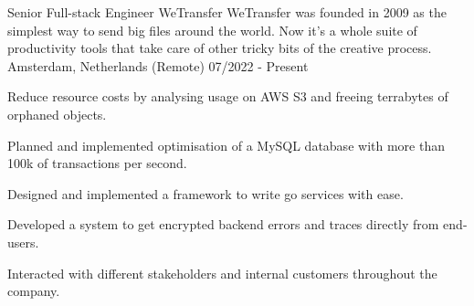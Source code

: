 
\begin{cventries}


  \cventry
    {Senior Full-stack Engineer}
    {WeTransfer}
    {WeTransfer was founded in 2009 as the simplest way to send big files around the world. Now it's a whole suite of productivity tools that take care of other tricky bits of the creative process.}
    {Amsterdam, Netherlands (Remote)}
    {07/2022 - Present}
    {
      \begin{cvitems}
        \item{Reduce resource costs by analysing usage on AWS S3 and freeing terrabytes of orphaned objects.}
        \item{Planned and implemented optimisation of a MySQL database with more than 100k of transactions per second.}
        \item{Designed and implemented a framework to write go services with ease.}
        \item{Developed a system to get encrypted backend errors and traces directly from end-users.}
        \item{Interacted with different stakeholders and internal customers throughout the company.}
      \end{cvitems}
    }


\end{cventries}

